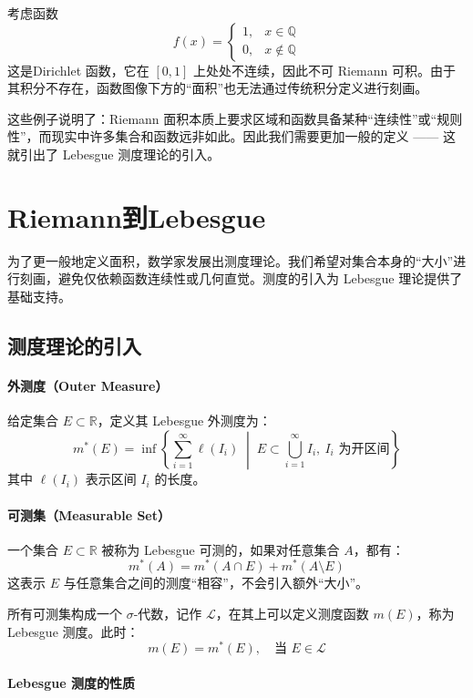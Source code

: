 \documentclass[a4paper, oneside]{article}
\begin{document}
考虑函数
\[
f(x) = 
\begin{cases}
  1, & x \in \mathbb{Q} \\
  0, & x \notin \mathbb{Q}
\end{cases}
\]
这是Dirichlet 函数，它在 $[0,1]$ 上处处不连续，因此不可 Riemann 可积。由于其积分不存在，函数图像下方的“面积”也无法通过传统积分定义进行刻画。

这些例子说明了：Riemann 面积本质上要求区域和函数具备某种“连续性”或“规则性”，而现实中许多集合和函数远非如此。因此我们需要更加一般的定义 —— 这就引出了 Lebesgue 测度理论的引入。

\section{Riemann到Lebesgue}

为了更一般地定义面积，数学家发展出测度理论。我们希望对集合本身的“大小”进行刻画，避免仅依赖函数连续性或几何直觉。测度的引入为 Lebesgue 理论提供了基础支持。

\subsection{测度理论的引入}

\paragraph{外测度（Outer Measure）}

给定集合 $E \subset \mathbb{R}$，定义其 Lebesgue 外测度为：
\[
m^*(E) = \inf \left\{ \sum_{i=1}^{\infty} \ell(I_i) \;\middle|\; E \subset \bigcup_{i=1}^{\infty} I_i,\ I_i \text{ 为开区间} \right\}
\]
其中 $\ell(I_i)$ 表示区间 $I_i$ 的长度。

\paragraph{可测集（Measurable Set）}

一个集合 $E \subset \mathbb{R}$ 被称为 Lebesgue 可测的，如果对任意集合 $A$，都有：
\[
m^*(A) = m^*(A \cap E) + m^*(A \setminus E)
\]
这表示 $E$ 与任意集合之间的测度“相容”，不会引入额外“大小”。

所有可测集构成一个 $\sigma$-代数，记作 $\mathcal{L}$，在其上可以定义测度函数 $m(E)$，称为 Lebesgue 测度。此时：
\[
m(E) = m^*(E),\quad \text{当 } E \in \mathcal{L}
\]

\paragraph{Lebesgue 测度的性质}
\end{document}
